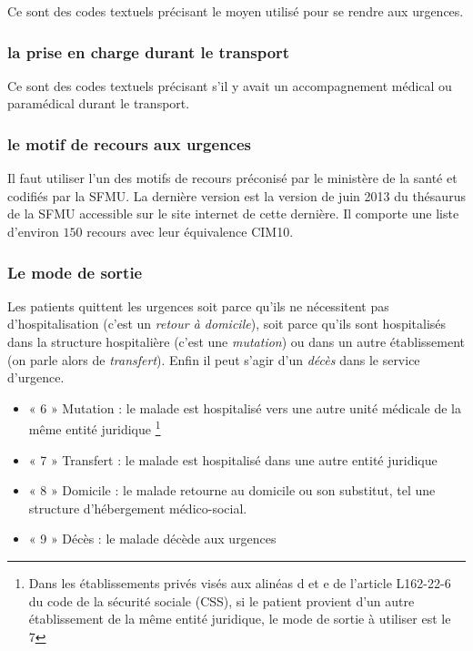 \documentclass[12pt,english,french,twoside]{book}\usepackage[]{graphicx}\usepackage[]{color}
\begin{document}
Ce sont des codes textuels précisant le moyen utilisé pour se rendre aux urgences.

\subsubsection{la prise en charge durant le transport}

Ce sont des codes textuels précisant s'il y avait un accompagnement médical ou paramédical durant le transport.

\subsubsection{le motif de recours aux urgences}

Il faut utiliser l'un des motifs de recours préconisé par le ministère de la santé \cite{13} et codifiés par la SFMU. La dernière version est la version de juin 2013 du thésaurus de la SFMU accessible sur le site internet de cette dernière. Il comporte une liste d'environ $150$ recours avec leur équivalence CIM10.


\subsubsection{Le mode de sortie}

\label{ref:sortie}
Les patients quittent les urgences soit parce qu'ils ne nécessitent pas d'hospitalisation (c'est un \emph{retour à domicile}), soit parce qu'ils sont hospitalisés dans la structure hospitalière (c'est une \emph{mutation}) ou dans un autre établissement (on parle alors de \emph{transfert}). Enfin il peut s'agir d'un \emph{décès} dans le service d'urgence.

\begin{itemize}
  \item « 6 » Mutation : le malade est hospitalisé vers une autre unité médicale de la même
entité juridique \footnote{Dans les établissements privés visés aux alinéas d et e de l'article L162-22-6 du code de la sécurité sociale (CSS), si le patient provient d’un autre établissement de la même entité juridique, le mode de sortie à utiliser est le 7}
  \item « 7 » Transfert : le malade est hospitalisé dans une autre entité juridique
  \item « 8 » Domicile : le malade retourne au domicile ou son substitut, tel une
structure d'hébergement médico-social.
  \item « 9 » Décès : le malade décède aux urgences
\end{itemize}
\end{document}
